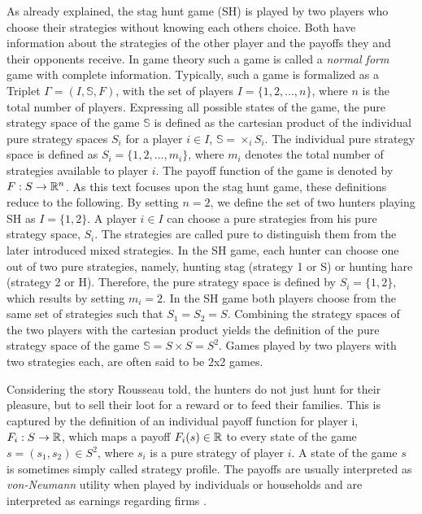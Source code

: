 \label{sec:traditional}
As already explained, the stag hunt game (SH) is played by 
two players who choose their
strategies without knowing each others choice.
Both have information about the strategies of the
other player and the payoffs they and their opponents receive. In game theory
such a game is called a \textit{normal form} game with complete information. 
Typically, such a game is formalized as a Triplet $\Gamma = (I,\mathbb{S},F)$, 
with the set of players $I=\{1,2,...,n\}$, where $n$ is the 
total number of players. 
Expressing all possible states of the game, the pure
strategy space of the game $\mathbb{S}$ is defined as the cartesian
product of the individual pure strategy spaces $S_i$ for a player $i \in I$,
$\mathbb{S}=\times_i S_i$. The individual pure strategy space is defined as
$S_i = \{1,2,...,m_i\}$, where $m_i$ denotes the total 
number of strategies available to player $i$. 
The payoff 
function of the game is denoted by $F: S \rightarrow \mathbb{R}^n$.
As this text focuses upon the stag hunt game, these definitions reduce to the 
following.
By setting $n=2$, we define the set of two hunters playing SH as $I=\{1,2\}$. A 
player $i \in I$  can choose a pure strategies from his 
pure strategy space, $S_i$. The strategies are called pure to distinguish
them from the later introduced mixed strategies. 
In the SH game, each hunter can choose one out of two pure strategies, namely, 
hunting stag (strategy 1 or S) or hunting hare (strategy 2 or H).
Therefore, the pure strategy space is defined by $S_i = \{1,2\}$, which results
by setting $m_i=2$. In the SH game both players choose from
the same set of strategies such that $S_1 =S_2=S$. Combining the strategy spaces
of the two players with the cartesian product
yields the definition of the pure strategy space of the game
$\mathbb{S}= S \times S = S^2$. Games played by two players with two strategies
each, are often said to be 2x2 games.    

Considering the story Rousseau told, the hunters do not just hunt
for their pleasure, but to sell their loot for a reward or to feed their 
families. 
This is captured by the definition of an individual payoff function for player
i, $F_i:S \rightarrow \mathbb{R}$, which maps a payoff $F_i(s) \in \mathbb{R}$ 
to every state of the game $s=(s_1,s_2) \in S^2$, where $s_i$ is a pure
strategy of player $i$. A state of the game $s$ is sometimes simply called 
strategy profile.
The payoffs are usually interpreted as \textit{von-Neumann} utility when 
played by individuals or households and are interpreted as earnings regarding 
firms \parencite{fudenberg_theory_1998}. 

